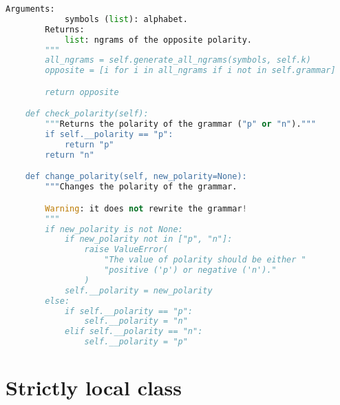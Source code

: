 \begin{lstlisting}[language=Python]
        Arguments:
            symbols (list): alphabet.
        Returns:
            list: ngrams of the opposite polarity.
        """
        all_ngrams = self.generate_all_ngrams(symbols, self.k)
        opposite = [i for i in all_ngrams if i not in self.grammar]

        return opposite

    def check_polarity(self):
        """Returns the polarity of the grammar ("p" or "n")."""
        if self.__polarity == "p":
            return "p"
        return "n"

    def change_polarity(self, new_polarity=None):
        """Changes the polarity of the grammar.

        Warning: it does not rewrite the grammar!
        """
        if new_polarity is not None:
            if new_polarity not in ["p", "n"]:
                raise ValueError(
                    "The value of polarity should be either "
                    "positive ('p') or negative ('n')."
                )
            self.__polarity = new_polarity
        else:
            if self.__polarity == "p":
                self.__polarity = "n"
            elif self.__polarity == "n":
                self.__polarity = "p"
\end{lstlisting}

\section{Strictly local class}

